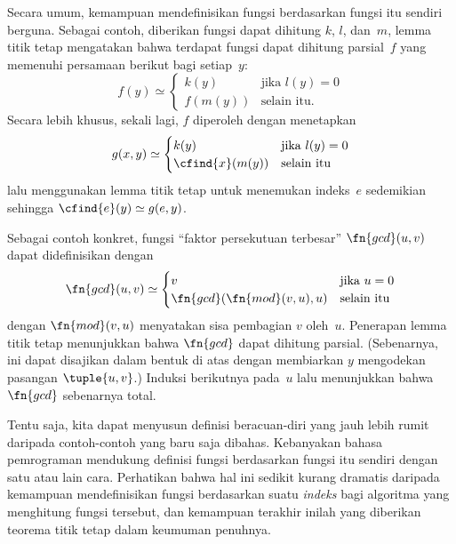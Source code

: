 \documentclass[../../../include/open-logic-section]{subfiles}
\begin{document}

Secara umum, kemampuan mendefinisikan fungsi berdasarkan fungsi itu sendiri
berguna. Sebagai contoh, diberikan fungsi dapat dihitung $k$, $l$, dan~$m$,
lemma titik tetap mengatakan bahwa terdapat fungsi dapat dihitung
parsial~$f$ yang memenuhi persamaan berikut bagi setiap~$y$:
\[
f(y) \simeq
\begin{cases}
k(y) & \text{jika $l(y) = 0$} \\
f(m(y)) & \text{selain itu.}
\end{cases}
\]
Secara lebih khusus, sekali lagi, $f$ diperoleh dengan menetapkan
\[
g(x,y) \simeq
\begin{cases}
k(y) & \text{jika $l(y) = 0$} \\
\cfind{x}(m(y)) & \text{selain itu}
\end{cases}
\]
lalu menggunakan lemma titik tetap untuk menemukan indeks~$e$ sedemikian
sehingga $\cfind{e}(y)\simeq g(e,y)$.

Sebagai contoh konkret, fungsi ``faktor persekutuan terbesar''
$\fn{gcd}(u,v)$ dapat didefinisikan dengan
\[
\fn{gcd}(u,v) \simeq
\begin{cases}
v & \text{jika $u = 0$} \\
\fn{gcd}(\fn{mod}(v, u), u) & \text{selain itu}
\end{cases}
\]
dengan $\fn{mod}(v,u)$ menyatakan sisa pembagian $v$ oleh~$u$. Penerapan
lemma titik tetap menunjukkan bahwa $\fn{gcd}$ dapat dihitung parsial.
(Sebenarnya, ini dapat disajikan dalam bentuk di atas dengan membiarkan $y$
mengodekan pasangan $\tuple{u,v}$.) Induksi berikutnya pada~$u$ lalu
menunjukkan bahwa $\fn{gcd}$ sebenarnya total.

Tentu saja, kita dapat menyusun definisi beracuan-diri yang jauh lebih rumit
daripada contoh-contoh yang baru saja dibahas. Kebanyakan bahasa pemrograman
mendukung definisi fungsi berdasarkan fungsi itu sendiri dengan satu atau
lain cara. Perhatikan bahwa hal ini sedikit kurang dramatis daripada kemampuan
mendefinisikan fungsi berdasarkan suatu \emph{indeks} bagi algoritma yang
menghitung fungsi tersebut, dan kemampuan terakhir inilah yang diberikan
teorema titik tetap dalam keumuman penuhnya.
\end{document}
